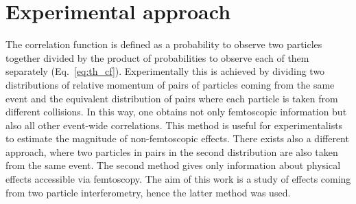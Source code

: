   \section{Experimental approach}
    The correlation function is defined as a probability to observe two particles together divided by the product of probabilities to observe each of them separately (Eq.~\ref{eq:th_cf}). 
    Experimentally this is achieved by dividing two distributions of relative momentum of pairs of particles coming from the same event and the equivalent distribution of pairs where each particle is taken from different collisions.
    In this way, one obtains not only femtoscopic information but also all other event-wide correlations.
    This method is useful for experimentalists to estimate the magnitude of non-femtoscopic effects.
    There exists also a different approach, where two particles in pairs in the second distribution are also taken from the same event.
    The second method gives only information about physical effects accessible via femtoscopy.
    The aim of this work is a study of effects coming from two particle interferometry, hence the latter method was used. 

